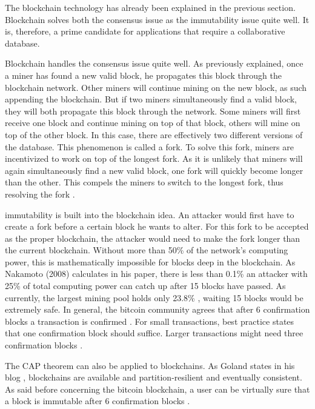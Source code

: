The blockchain technology has already been explained in the previous section. Blockchain solves both the consensus issue as the immutability issue quite well. It is, therefore, a prime candidate for applications that require a collaborative database.

Blockchain handles the consensus issue quite well. As previously explained, once a miner has found a new valid block, he propagates this block through the blockchain network. Other miners will continue mining on the new block, as such appending the blockchain. But if two miners simultaneously find a valid block, they will both propagate this block through the network. Some miners will first receive one block and continue mining on top of that block, others will mine on top of the other block. In this case, there are effectively two different versions of the database. This phenomenon is called a fork. To solve this fork, miners are incentivized to work on top of the longest fork. As it is unlikely that miners will again simultaneously find a new valid block, one fork will quickly become longer than the other. This compels the miners to switch to the longest fork, thus resolving the fork \cite{antonopoulos:2014}. 


immutability is built into the blockchain idea. An attacker would first have to create a fork before a certain block he wants to alter. For this fork to be accepted as the proper blockchain, the attacker would need to make the fork longer than the current blockchain. Without more than 50\% of the network's computing power, this is mathematically impossible for blocks deep in the blockchain. As Nakamoto (2008) calculates in his paper, there is less than 0.1\% an attacker with 25\% of total computing power can catch up after 15 blocks have passed. As currently, the largest mining pool holds only 23.8\% \cite{hashrate-distribution}, waiting 15 blocks would be extremely safe. In general, the bitcoin community agrees that after 6 confirmation blocks a transaction is confirmed \cite{bitcoin-confirmation-amount}. For small transactions, best practice states that one confirmation block should suffice. Larger transactions might need three confirmation blocks \cite{confirmation-safety}.


The CAP theorem can also be applied to blockchains. As Goland states in his blog \cite{blockchain-cap}, blockchains are available and partition-resilient and eventually consistent. As said before concerning the bitcoin blockchain, a user can be virtually sure that a block is immutable after 6 confirmation blocks \cite{bitcoin-confirmation-amount}.

